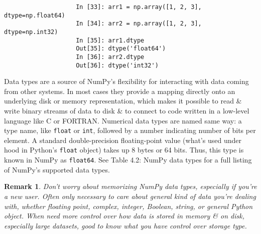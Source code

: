 \documentclass{article}
\newtheorem{remark}{Remark}
\begin{document}
\begin{enumerate}
\begin{itemize}
\begin{itemize}
\begin{itemize}
				\begin{verbatim}
					In [33]: arr1 = np.array([1, 2, 3], dtype=np.float64)
					In [34]: arr2 = np.array([1, 2, 3], dtype=np.int32)
					In [35]: arr1.dtype
					Out[35]: dtype('float64')
					In [36]: arr2.dtype
					Out[36]: dtype('int32')
				\end{verbatim}
				Data types are a source of NumPy's flexibility for interacting with data coming from other systems. In most cases they provide a mapping directly onto an underlying disk or memory representation, which makes it possible to read \& write binary streams of data to disk \&  to connect to code written in a low-level language like C or FORTRAN. Numerical data types are named same way: a type name, like {\tt float} or {\tt int}, followed by a number indicating number of bits per element. A standard double-precision floating-point value (what's used under hood in Python's {\tt float} object) takes up 8 bytes or 64 bits. Thus, this type is known in NumPy as {\tt float64}. See {\sf Table 4.2: NumPy data types} for a full listing of NumPy's supported data types.
				\begin{remark}
					Don't worry about memorizing NumPy data types, especially if you're a new user. Often only necessary to care about general \emph{kind} of data you're dealing with, whether floating point, complex, integer, Boolean, string, or general Python object. When need more control over how data is stored in memory \& on disk, especially large datasets, good to know what you have control over storage type.
				\end{remark}
				

\end{itemize}
\end{itemize}
\end{itemize}
\end{enumerate}
\end{document}
